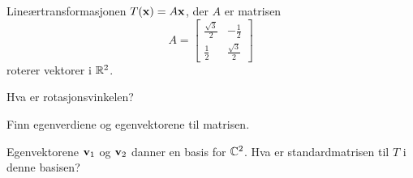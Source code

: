 \begin{oppgave}
Lineærtransformasjonen $T(\mathbf{x})=A\mathbf{x}$, der $A$ er matrisen
\[
A=
\begin{bmatrix}
\frac{\sqrt{3}}{2} & -\frac{1}{2} \\ \frac{1}{2} & \frac{\sqrt{3}}{2}
\end{bmatrix}
\]
roterer vektorer i $\mathbb{R}^2$. 
\begin{punkt}
Hva er rotasjonsvinkelen?
\end{punkt}
\begin{punkt}
Finn egenverdiene og egenvektorene til matrisen. 
\end{punkt}
\begin{punkt}
Egenvektorene $\mathbf{v}_1$ og $\mathbf{v}_2$ danner en basis for $\mathbb{C}^2$. Hva er standardmatrisen til $T$ i denne basisen?
\end{punkt}

\end{oppgave}






